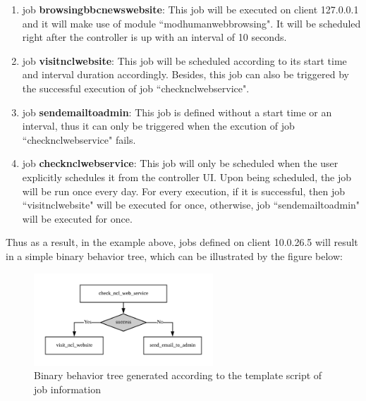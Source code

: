 \documentclass[12pt]{report}
\begin{document}
\begin{enumerate}
\item job \textbf{browsing\textunderscore bbc\textunderscore news\textunderscore website}: This job will be executed on client 127.0.0.1 and it will make use of module ``mod\textunderscore human\textunderscore web\textunderscore browsing". It will be scheduled right after the controller is up with an interval of 10 seconds.

\item job \textbf{visit\textunderscore ncl\textunderscore website}: This job will be scheduled according to its start time and interval duration accordingly. Besides, this job can also be triggered by the successful execution of job ``check\textunderscore ncl\textunderscore web\textunderscore service".

\item job \textbf{send\textunderscore email\textunderscore to\textunderscore admin}: This job is defined without a start time or an interval, thus it can only be triggered when the excution of job ``check\textunderscore ncl\textunderscore web\textunderscore service" fails.

\item job \textbf{check\textunderscore ncl\textunderscore web\textunderscore service}: This job will only be scheduled when the user explicitly schedules it from the controller UI. Upon being scheduled, the job will be run once every day. For every execution, if it is successful, then job ``visit\textunderscore ncl\textunderscore website" will be executed for once, otherwise, job ``send\textunderscore email\textunderscore to\textunderscore admin" will be executed for once.
\end{enumerate}

Thus as a result, in the example above, jobs defined on client 10.0.26.5 will result in a simple binary behavior tree, which can be illustrated by the figure below:

\begin{figure}[h!]
	\centering
	\includegraphics[width=0.6\textwidth]{./pictures/template-bbt}
	\caption{Binary behavior tree generated according to the template script of job
	\label{fig:temp-bbt} information}
\end{figure}
\end{document}
